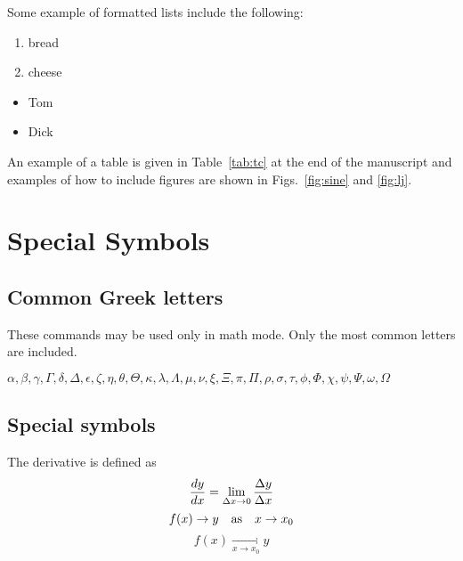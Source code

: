 \documentclass[a4paper,10pt,extramargin]{tubsartcl}
\begin{document}
Some example of formatted lists include the
following:

\begin{enumerate}

\item bread

\item cheese

\end{enumerate}

\begin{itemize}

\item Tom

\item Dick

\end{itemize}

An example of a table is given in Table~\ref{tab:tc} at the end
of the manuscript and examples of how to include figures are
shown in Figs.~\ref{fig:sine} and \ref{fig:lj}.

\section{Special Symbols}

\subsection{Common Greek letters}

These commands may be used only in math mode. Only the most common
letters are included.

$\alpha, 
\beta, \gamma, \Gamma,
\delta,\Delta,
\epsilon, \zeta, \eta, \theta, \Theta, \kappa,
\lambda, \Lambda, \mu, \nu,
\xi, \Xi,
\pi, \Pi,
\rho,
\sigma, 
\tau,
\phi, \Phi,
\chi,
\psi, \Psi,
\omega, \Omega$

\subsection{Special symbols}

The derivative is defined as
\begin{equation}
{dy \over dx} = \lim_{\Delta x \to 0}{\Delta y
\over
\Delta x}
\end{equation}
\begin{equation}
f(x) \to y \quad {\rm as} \quad x \to
x_{0}
\end{equation}
\begin{equation}
f(x) \mathop {\longrightarrow}
\limits_{x \to x_0} y
\end{equation}
\end{document}
